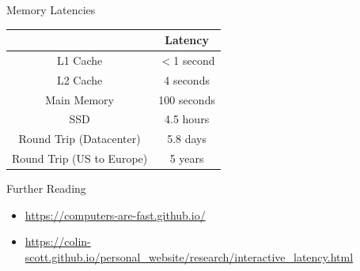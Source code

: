 \documentclass[12pt, aspectration=169]{beamer}
\begin{document}
    \begin{frame}{Memory Latencies}
        \begin{center}
            \begin{tabular}{|c c|}
             \hline
              & Latency \\ [0.5ex]
             \hline\hline
             L1 Cache & $<$1 second \\
             \hline
             L2 Cache & 4 seconds \\
             \hline
             Main Memory & 100 seconds \\
             \hline
             SSD & 4.5 hours \\ [1ex]
             \hline
             Round Trip (Datacenter)   & 5.8 days     \\
             \hline
             Round Trip (US to Europe) & 5 years \\ [1ex]
             \hline
            \end{tabular}
        \end{center}
    \end{frame}

    \begin{frame}{Further Reading}
        \begin{itemize}
            \item \url{https://computers-are-fast.github.io/}
            \item \url{https://colin-scott.github.io/personal_website/research/interactive_latency.html}
        \end{itemize}
    \end{frame}
\end{document}
